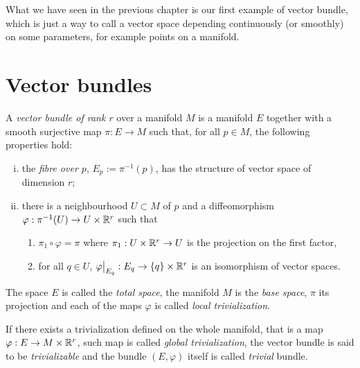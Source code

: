 What we have seen in the previous chapter is our first example of vector bundle, which is just a way to call a vector space depending continuously (or smoothly) on some parameters, for example points on a manifold.

\section{Vector bundles}\label{sec:vec-bdls}

\begin{definition}\label{def:vector_bundle}
  A \emph{vector bundle of rank $r$} over a manifold $M$ is a manifold $E$ together with a smooth surjective map $\pi : E \to M$ such that, for all $p\in M$, the following properties hold:
  \begin{enumerate}[(i)]
    \item the \emph{fibre over $p$}, $E_p := \pi^{-1}(p)$, has the structure of vector space of dimension $r$;
    \item there is a neighbourhood $U\subset M$ of $p$ and a diffeomorphism $\varphi: \pi^{-1}(U) \to U \times \mathbb{R}^r$ such that
          \begin{enumerate}
            \item $\pi_1 \circ \varphi = \pi$ where $\pi_1: U\times\mathbb{R}^r\to U$ is the projection on the first factor,
            \item for all $q\in U$, $\varphi\big|_{E_q} : E_q \to \{q\}\times \mathbb{R}^r$ is an isomorphism of vector spaces.
          \end{enumerate}
  \end{enumerate}

  The space $E$ is called the \emph{total space}, the manifold $M$ is the \emph{base space}, $\pi$ its projection and each of the maps $\varphi$ is called \emph{local trivialization}.

  If there exists a trivialization defined on the whole manifold, that is a map $\varphi: E \to M\times \mathbb{R}^r$, such map is called \emph{global trivialization}, the vector bundle is said to be \emph{trivializable} and the bundle $(E, \varphi)$ itself is called \emph{trivial} bundle.
\end{definition}

